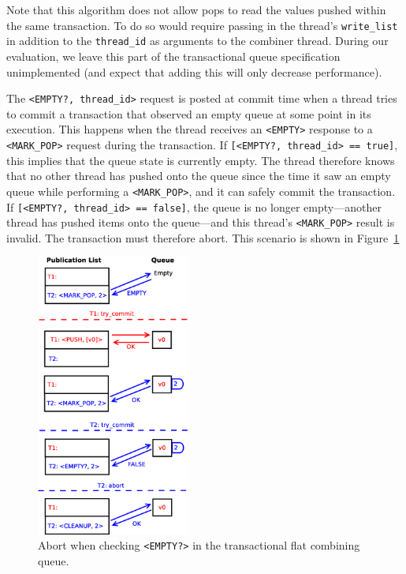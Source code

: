Note that this algorithm does not allow pops to read the values pushed within the same transaction. To do so would require passing in the thread's \texttt{write\_list} in addition to the \texttt{thread\_id} as arguments to the combiner thread. During our evaluation, we leave this part of the transactional queue specification unimplemented (and expect that adding this will only decrease performance).

The \texttt{<EMPTY?, thread\_id>} request is posted at commit time when a thread tries to commit a transaction that observed an empty queue at some point in its execution. This happens when the thread receives an \texttt{<EMPTY>} response to a \texttt{<MARK\_POP>} request during the transaction. If \texttt{[<EMPTY?, thread\_id> == true]}, this implies that the queue state is currently empty.
The thread therefore knows that no other thread has pushed onto the queue since the time it saw an empty queue while performing a \texttt{<MARK\_POP>}, and it can safely commit the transaction. If \texttt{[<EMPTY?, thread\_id> == false]}, the queue is no longer empty---another thread has pushed items onto the queue---and this thread's \texttt{<MARK\_POP>} result is invalid. The transaction must therefore abort. This scenario is shown in Figure~\ref{fig:fcqueue_abort2}

\begin{figure}[t]
\centering
\includegraphics[width=0.45\textwidth]{fcqueue_abort2}
    \caption{Abort when checking \texttt{<EMPTY?>} in the transactional flat combining queue.}
\label{fig:fcqueue_abort2}
\end{figure}

